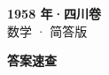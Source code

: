 \documentclass[zihao=-4, a4paper]{ctexart}
\begin{document}
\begin{center}
  {\Large\bfseries 1958 年·四川卷}\\[4pt]
  {\large 数学 · 简答版}
\end{center}
\medskip
{}

\clearpage
{}
\begin{center}{\Large\bfseries 答案速查}\end{center}
\medskip

\end{document}
